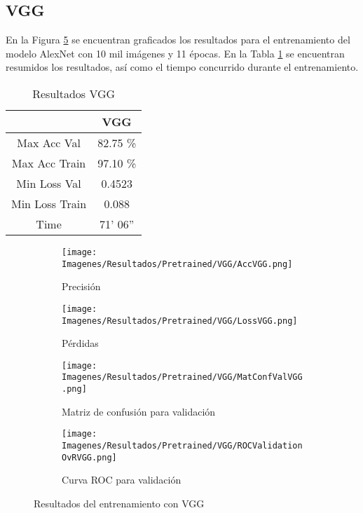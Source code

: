 \documentclass{report}
\begin{document}
\newpage
\subsection{VGG}



En la Figura \ref{fig:RVGG} se encuentran graficados los resultados para el entrenamiento del modelo AlexNet con 10 mil imágenes y 11 épocas. En la Tabla \ref{tab:RVGG} se encuentran resumidos los resultados, así como el tiempo concurrido durante el entrenamiento.


\begin{table}[H]
\centering
\begin{tabular}{|c|c|}
\hline
\cellcolor[HTML]{FFFFFF}{\color[HTML]{000000} Modelo} & VGG \\ \hline
Max Acc Val                                           & 82.75 \%        \\ \hline
Max Acc Train                                         & 97.10 \%        \\ \hline
Min Loss Val                                          & 0.4523        \\ \hline
Min Loss Train                                        & 0.088        \\ \hline
Time                                                  & 71' 06''        \\ \hline
\end{tabular}
\caption{Resultados VGG}
\label{tab:RVGG}
\end{table}


\vspace{0.4cm}
\begin{figure}[H]
	 	\centering
	 	\begin{subfigure}[b]{0.45\linewidth}
	 	\centering
	 		\texttt{[image: Imagenes/Resultados/Pretrained/VGG/AccVGG.png]}
	 		\caption{ Precisión  }
                    \label{fig:VGGPrecision}
	 	\end{subfigure}
	 	\begin{subfigure}[b]{0.45\linewidth}
	 	\centering
	 		\texttt{[image: Imagenes/Resultados/Pretrained/VGG/LossVGG.png]}
                    \caption{ Pérdidas }
                    \label{fig:VGGLoss}
	 	\end{subfigure}
	 	\centering
	 	\begin{subfigure}[b]{0.45\linewidth}
	 	\centering
	 		\texttt{[image: Imagenes/Resultados/Pretrained/VGG/MatConfValVGG.png]}
	 		\caption{ Matriz de confusión para validación }
                    \label{fig:VGGMatConf}
	 	\end{subfigure}
	 	\centering
	 	\begin{subfigure}[b]{0.45\linewidth}
	 	\centering
	 		\texttt{[image: Imagenes/Resultados/Pretrained/VGG/ROCValidationOvRVGG.png]}
	 		\caption{ Curva ROC para validación }
                    \label{fig:VGGCurvaROC}
	 	\end{subfigure}
	 	\caption{ Resultados del entrenamiento con VGG}
	 	\label{fig:RVGG}
\end{figure}
\end{document}
